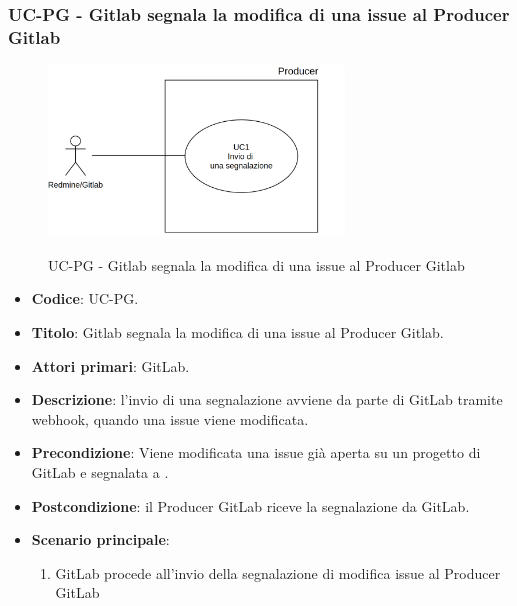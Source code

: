 	\subsubsection{UC\theuccount-PG - Gitlab segnala la modifica di una issue al Producer Gitlab}
	\begin{figure}[H]
		\centering
		\includegraphics[width=0.7\textwidth]{img/UC1.png}\\
		\caption{UC\theuccount-PG - Gitlab segnala la modifica di una issue al Producer Gitlab}
	\end{figure}
	\begin{itemize}
		\item \textbf{Codice}: UC\theuccount-PG.
		\item \textbf{Titolo}: Gitlab segnala la modifica di una issue al Producer Gitlab.
		\item \textbf{Attori primari}: GitLab.
		\item \textbf{Descrizione}: l'invio di una segnalazione avviene
		da parte di GitLab tramite webhook, quando una issue viene modificata.
		\item \textbf{Precondizione}: Viene modificata una issue già aperta su un
		progetto di GitLab e segnalata a \progetto.
		\item \textbf{Postcondizione}: il Producer GitLab riceve la segnalazione da GitLab.
		\item \textbf{Scenario principale}: 
		\begin{enumerate}
			\item GitLab procede all'invio della segnalazione di modifica issue al Producer GitLab
		\end{enumerate}
		
	\end{itemize}